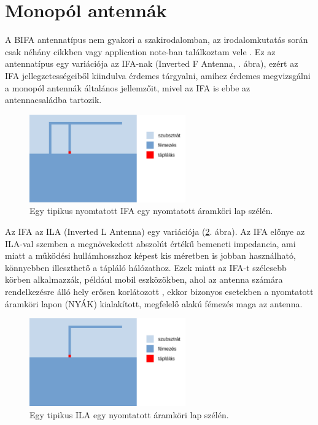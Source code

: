 \section{Monopól antennák}
\par A BIFA antennatípus nem gyakori a szakirodalomban, az irodalomkutatás során csak néhány cikkben vagy application note-ban találkoztam vele \cite{an847, bifa-be, bifa-ma, bifa-ca}. Ez az antennatípus egy variációja az IFA-nak (Inverted F Antenna, . ábra), ezért az IFA jellegzetességeiből kiindulva érdemes tárgyalni, amihez érdemes megvizsgálni a monopól antennák általános jellemzőit, mivel az IFA is ebbe az antennacsaládba tartozik.
\begin{figure}[h]
	\centering
	\includegraphics[width=0.6\textwidth]{kep/tipikus_ifa.pdf}
	\caption{Egy tipikus nyomtatott IFA egy nyomtatott áramköri lap szélén.}
	\label{fig:tipikus_ifa}
\end{figure}
\par Az IFA az ILA (Inverted L Antenna) egy variációja (\ref{fig:tipikus_ila}. ábra). Az IFA előnye az ILA-val szemben a megnövekedett abszolút értékű bemeneti impedancia, ami miatt a működési hullámhosszhoz képest kis méretben is jobban használható, könnyebben illeszthető a tápláló hálózathoz. Ezek miatt az IFA-t szélesebb körben alkalmazzák, például mobil eszközökben, ahol az antenna számára rendelkezésre álló hely erősen korlátozott \cite{multi-band}, ekkor bizonyos esetekben a nyomtatott áramköri lapon (NYÁK) kialakított, megfelelő alakú fémezés maga az antenna.
\begin{figure}[h]
	\centering
	\includegraphics[width=0.6\textwidth]{kep/tipikus_ila.pdf}
	\caption{Egy tipikus ILA egy nyomtatott áramköri lap szélén.}
	\label{fig:tipikus_ila}
\end{figure}
